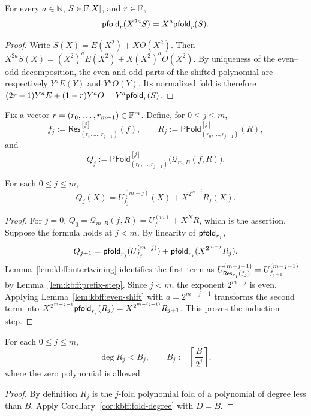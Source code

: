 \begin{lemma}\label{lem:kbff:even-shift}
For every $a\in\mathbb N$, $S\in\mathbb{F}[X]$, and $r\in\mathbb{F}$,
\[
 \mathsf{pfold}_r(X^{2a}S)=X^a\mathsf{pfold}_r(S).
\]
\end{lemma}
\begin{proof}
Write $S(X)=E(X^2)+XO(X^2)$. Then
$X^{2a}S(X)=(X^2)^aE(X^2)+X(X^2)^aO(X^2)$.
By uniqueness of the even--odd decomposition, the even and odd parts of the shifted polynomial are respectively $Y^aE(Y)$ and $Y^aO(Y)$. Its normalized fold is therefore
$(2r-1)Y^aE+(1-r)Y^aO=Y^a\mathsf{pfold}_r(S)$.
\end{proof}

\begin{definition}\label{def:kbff:masked-chain}
Fix a vector $r=(r_0,\ldots,r_{m-1})\in\mathbb{F}^m$.
Define, for $0\leq j\leq m$,
\[
 f_j:=\mathsf{Res}^{[j]}_{(r_0,\ldots,r_{j-1})}(f),\qquad
 R_j:=\mathsf{PFold}^{[j]}_{(r_0,\ldots,r_{j-1})}(R),
\]
and
\[
 Q_j:=\mathsf{PFold}^{[j]}_{(r_0,\ldots,r_{j-1})}
                 \bigl(\mathscr Q_{m,B}(f,R)\bigr).
\]
\end{definition}

\begin{theorem}\label{thm:kbff:masked-invariant}
For each $0\leq j\leq m$,
\[
 \boxed{Q_j(X)=U_{f_j}^{(m-j)}(X)+X^{2^{m-j}}R_j(X).}
\]
\end{theorem}
\begin{proof}
For $j=0$, $Q_0=\mathscr Q_{m,B}(f,R)=U_f^{(m)}+X^NR$, which is the assertion. Suppose the formula holds at $j<m$. By linearity of $\mathsf{pfold}_{r_j}$,
\[
 Q_{j+1}=\mathsf{pfold}_{r_j}(U_{f_j}^{(m-j)})
 +\mathsf{pfold}_{r_j}(X^{2^{m-j}}R_j).
\]
Lemma~\ref{lem:kbff:intertwining} identifies the first term as
$U_{\mathsf{Res}_{r_j}(f_j)}^{(m-j-1)}=U_{f_{j+1}}^{(m-j-1)}$
by Lemma~\ref{lem:kbff:prefix-step}.
Since $j<m$, the exponent $2^{m-j}$ is even. Applying Lemma~\ref{lem:kbff:even-shift} with $a=2^{m-j-1}$ transforms the second term into
$X^{2^{m-j-1}}\mathsf{pfold}_{r_j}(R_j)=X^{2^{m-(j+1)}}R_{j+1}$.
This proves the induction step.
\end{proof}

\begin{lemma}\label{lem:kbff:residual-degree}
For each $0\leq j\leq m$,
\[
 \deg R_j< B_j,\qquad
 B_j:=\left\lceil\frac{B}{2^j}\right\rceil,
\]
where the zero polynomial is allowed.
\end{lemma}
\begin{proof}
By definition $R_j$ is the $j$-fold polynomial fold of a polynomial of degree less than $B$. Apply Corollary~\ref{cor:kbff:fold-degree} with $D=B$.
\end{proof}

